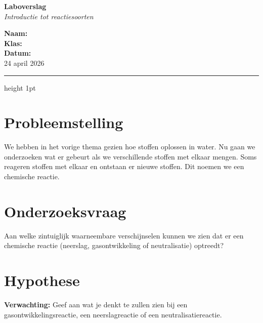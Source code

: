 \documentclass[a4paper, 11pt]{article}
\begin{document}
\noindent
\begin{minipage}[b]{0.35\textwidth}
\end{minipage}
\begin{minipage}[b]{0.4\textwidth}
    \centering
    {\LARGE \textbf{Laboverslag}} \\[0.2cm]
    {\small \textit{Introductie tot reactiesoorten}}
\end{minipage}
\begin{minipage}[b]{0.3\textwidth}
    \flushright
    \small
    \textbf{Naam:} \makebox[3cm][r]{\dotfill} \\
    \textbf{Klas:} \makebox[3cm][r]{\dotfill} \\
    \textbf{Datum:} \\
    24 april 2026
\end{minipage}

\vspace{0.4cm}
\hrule height 1pt
\vspace{0.8cm}

\section{Probleemstelling}
We hebben in het vorige thema gezien hoe stoffen oplossen in water. Nu gaan we onderzoeken wat er gebeurt als we verschillende stoffen met elkaar mengen. Soms reageren stoffen met elkaar en ontstaan er nieuwe stoffen. Dit noemen we een chemische reactie.

\section{Onderzoeksvraag}
Aan welke zintuiglijk waarneembare verschijnselen kunnen we zien dat er een chemische reactie (neerslag, gasontwikkeling of neutralisatie) optreedt?

\section{Hypothese}
\textbf{Verwachting:} Geef aan wat je denkt te zullen zien bij een gasontwikkelingsreactie, een neerslagreactie of een neutralisatiereactie.
\end{document}
